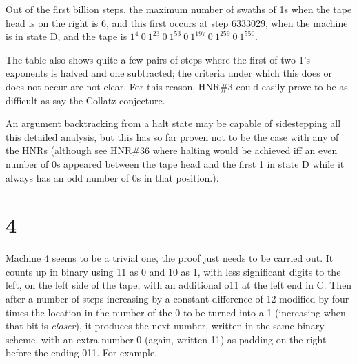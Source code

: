 \documentclass[12pt]{article}
\begin{document}
Out of the first billion steps, the maximum number of swaths of 1s when the tape head is on the right is 6, and this first occurs at step 6333029, when the machine is in state D, and the tape is \texttt{$1^4~0~1^{23}~0~1^{53}~0~1^{197}~0~1^{259}~0~1^{550}$}.

The table also shows quite a few pairs of steps where the first of two 1's exponents
is halved and one subtracted; the criteria under which this does or does not occur
are not clear. For this reason, HNR\#3 could easily prove to be as difficult as
say the Collatz conjecture.

An argument backtracking from a halt state may be capable of sidestepping all this detailed analysis,
but this has so far proven not to be the case with any of the HNRs (although see HNR\#36 where halting
would be achieved iff an even number of 0s appeared between the tape head and the first 1 in state D
while it always has an odd number of 0s in that position.).



\clearpage
{}
{}
\section*{4}

Machine 4 seems to be a trivial one, the proof just needs to be carried out. It counts up in binary using 11 as 0 and 10 as 1, with less significant digits to the left, on the left side of the tape, with an additional o11 at the left end in C.
Then after a number of steps increasing by a constant difference of 12 modified by four times the location in the number of the 0 to be turned into a 1 (increasing when that bit is \emph{closer}), it produces the next number, written in the same binary scheme,
with an extra number 0 (again, written 11) as padding on the right before the ending 011. For example,
\end{document}
